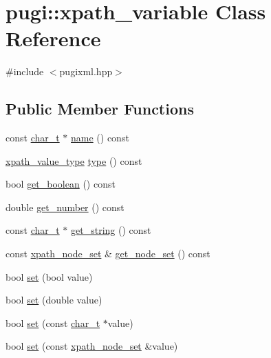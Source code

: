 \hypertarget{classpugi_1_1xpath__variable}{\section{pugi\-:\-:xpath\-\_\-variable Class Reference}
\label{classpugi_1_1xpath__variable}
}


{\ttfamily \#include $<$pugixml.\-hpp$>$}

\subsection*{Public Member Functions}
\begin{DoxyCompactItemize}
\item 
const \hyperlink{namespacepugi_aef5a7a62cba0507542220ea15afe39df}{char\-\_\-t} $\ast$ \hyperlink{classpugi_1_1xpath__variable_adfee2f69aadd5a9fd36ba67ea9f11c9c}{name} () const 
\item 
\hyperlink{namespacepugi_ae3820874caf240e9f311bfd2790a84d6}{xpath\-\_\-value\-\_\-type} \hyperlink{classpugi_1_1xpath__variable_a33713853d1298ce11fb382258ffe11d4}{type} () const 
\item 
bool \hyperlink{classpugi_1_1xpath__variable_a2d562014ddb3c9f0a2d6b8f36f3adc36}{get\-\_\-boolean} () const 
\item 
double \hyperlink{classpugi_1_1xpath__variable_aad1197f1eecb6072794389eb997d539a}{get\-\_\-number} () const 
\item 
const \hyperlink{namespacepugi_aef5a7a62cba0507542220ea15afe39df}{char\-\_\-t} $\ast$ \hyperlink{classpugi_1_1xpath__variable_ab6c9175201e43003c5abcdd3bc426bbf}{get\-\_\-string} () const 
\item 
const \hyperlink{classpugi_1_1xpath__node__set}{xpath\-\_\-node\-\_\-set} \& \hyperlink{classpugi_1_1xpath__variable_aa82f2112e66c7745066788068a14f8f5}{get\-\_\-node\-\_\-set} () const 
\item 
bool \hyperlink{classpugi_1_1xpath__variable_a1e6ee8876fba9f01373df452416e48fb}{set} (bool value)
\item 
bool \hyperlink{classpugi_1_1xpath__variable_ae92b5bdaf24fa6f94f281ae5d046d56a}{set} (double value)
\item 
bool \hyperlink{classpugi_1_1xpath__variable_acaedec0610338a1165bbcd0658db34f9}{set} (const \hyperlink{namespacepugi_aef5a7a62cba0507542220ea15afe39df}{char\-\_\-t} $\ast$value)
\item 
bool \hyperlink{classpugi_1_1xpath__variable_aad7a9022098440aeac16ef90d849aee4}{set} (const \hyperlink{classpugi_1_1xpath__node__set}{xpath\-\_\-node\-\_\-set} \&value)
\end{DoxyCompactItemize}
